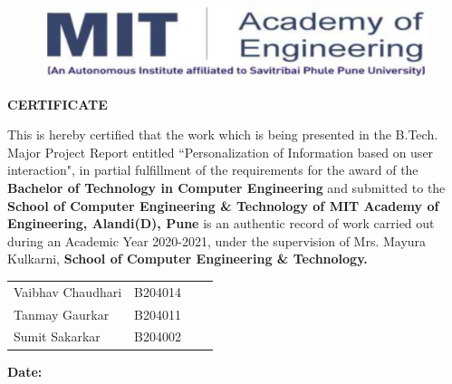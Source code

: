 \newpage
\begin{figure}[h!]
	\begin{center}
		\includegraphics[scale=0.3]{mitnlogo}
	\end{center}
\end{figure}
\begin{center}
{\LARGE{\textbf{{CERTIFICATE}}}} \\
\end{center}

\renewcommand{\baselinestretch}{1.6}
\large{This is hereby certified that the work which is being presented in the B.Tech. Major Project Report entitled ``Personalization of Information based on user interaction", in partial fulfillment of the requirements for the award of the {\bf{Bachelor of Technology in Computer Engineering}} and submitted to the {\bf{ School of Computer Engineering \& Technology of MIT Academy of Engineering, Alandi(D), Pune}} is an authentic record of work carried out during an Academic Year  2020-2021, under the supervision of Mrs. Mayura Kulkarni, {\bf{School of Computer Engineering \& Technology.}}}
\begin{center}
\begin{tabular}{p{5cm}p{3.5cm} c p{4.8cm}}
Vaibhav Chaudhari  &  B204014\\[-4mm]
Tanmay Gaurkar &  B204011\\[-4mm]
Sumit Sakarkar  & B204002\\[-4mm]

\end{tabular}
\end{center}
\vspace*{2mm}
\textbf{Date:}
\vspace*{15mm}

